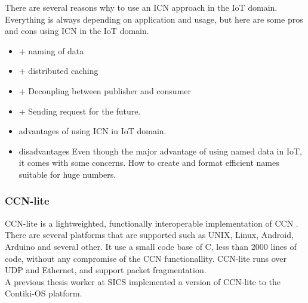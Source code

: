 There are several reasons why to use an ICN approach in the IoT domain. Everything is always depending on application and usage, but here are some pros and cons using ICN in the IoT domain.

\begin{itemize}
	\item + naming of data
	\item + distributed caching
	\item + Decoupling between publisher and consumer
	\item + Sending request for the future.
	\item advantages of using ICN in IoT domain.
	\item disadvantages
	Even though the major advantage of using named data in IoT, it comes with some concerns. How to create and format efficient names suitable for huge numbers.
\end{itemize}




\subsubsection{CCN-lite}
CCN-lite is a lightweighted, functionally interoperable implementation of CCN \cite{CCN-LITE}. There are several platforms that are supported such as UNIX, Linux, Android, Arduino and several other. It use a small code base of C, less than 2000 lines of code, without any compromise of the CCN functionallity. CCN-lite runs over UDP and Ethernet, and support packet fragmentation.
\\
A previous thesis worker at SICS implemented a version of CCN-lite to the Contiki-OS platform.






















